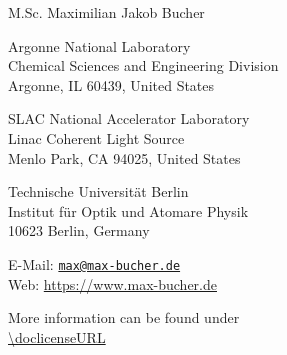 \begin{flushleft}
{\Large M.Sc. Maximilian Jakob Bucher}\\
\footnotesize{Argonne National Laboratory\\
Chemical Sciences and Engineering Division\\
Argonne, IL 60439, United States\\
\vspace{0.5cm}

SLAC National Accelerator Laboratory\\
Linac Coherent Light Source\\
Menlo Park, CA 94025, United States
\vspace{0.5cm}

Technische Universit{\"a}t Berlin\\
Institut f{\"u}r Optik und Atomare Physik\\
10623 Berlin, Germany
\vspace{0.5cm}

E-Mail: \href{mailto:max@max-bucher.de}{\nolinkurl{max@max-bucher.de} }\\
Web: \url{https://www.max-bucher.de}}
\end{flushleft}
\vspace{10.5cm}
\doclicenseThis
More information can be found under\\
\url{\doclicenseURL}

